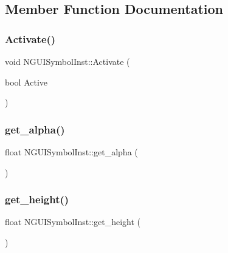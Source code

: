 \subsection{Member Function Documentation}
\hypertarget{class_n_g_u_i_symbol_inst_ac35fe91439da9e92e63ab0fd7a760f50}{}\label{class_n_g_u_i_symbol_inst_ac35fe91439da9e92e63ab0fd7a760f50} 
\subsubsection{\texorpdfstring{Activate()}{Activate()}}
{\footnotesize\ttfamily void N\+G\+U\+I\+Symbol\+Inst\+::\+Activate (\begin{DoxyParamCaption}\item[{bool}]{Active }\end{DoxyParamCaption})}

\hypertarget{class_n_g_u_i_symbol_inst_a98426f8bd88470348929e7576f5faed5}{}\label{class_n_g_u_i_symbol_inst_a98426f8bd88470348929e7576f5faed5} 
\subsubsection{\texorpdfstring{get\+\_\+alpha()}{get\_alpha()}}
{\footnotesize\ttfamily float N\+G\+U\+I\+Symbol\+Inst\+::get\+\_\+alpha (\begin{DoxyParamCaption}{ }\end{DoxyParamCaption})}

\hypertarget{class_n_g_u_i_symbol_inst_a8bb9dd269a5457c618088b3cca61fe3c}{}\label{class_n_g_u_i_symbol_inst_a8bb9dd269a5457c618088b3cca61fe3c} 
\subsubsection{\texorpdfstring{get\+\_\+height()}{get\_height()}}
{\footnotesize\ttfamily float N\+G\+U\+I\+Symbol\+Inst\+::get\+\_\+height (\begin{DoxyParamCaption}{ }\end{DoxyParamCaption})}

